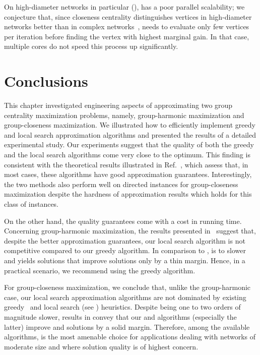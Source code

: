 On high-diameter networks in particular (),
\greedyc has a poor parallel scalability; we conjecture that, since closeness
centrality distinguishes vertices in high-diameter networks better than in
complex networks~\cite[Ch. 7]{newman2018networks}, \greedyc needs to evaluate
only few vertices per iteration before finding the vertex with highest marginal
gain. In that case, multiple cores do not speed this process up significantly.


\section{Conclusions}
%
This chapter investigated engineering aspects of
approximating  two group centrality maximization problems, namely,
group-harmonic maximization and group-closeness maximization. We illustrated
how to efficiently implement greedy and local search approximation algorithms
and presented the results of a detailed experimental study. Our experiments
suggest that the quality of both the greedy and the local search algorithms
come very close to the optimum. This finding is consistent with the theoretical
results illustrated in Ref.~\cite{DBLP:conf/alenex/AngrimanBDGGM21}, which
assess that, in most cases, these algorithms have good approximation
guarantees. Interestingly, the two methods also perform well on directed
instances for group-closeness maximization despite the hardness of
approximation results which holds for this class of instances.

On the other hand, the quality guarantees come with a cost in running time.
Concerning group-harmonic maximization, the results presented
in~ suggest that, despite the better approximation
guarantees, our local search algorithm is not competitive compared to
our greedy algorithm. In comparison to \greedyh, \greedylsh is \minSlowdLSGRHCplxDir
to \maxSlowdLSGRHRoadDirWei slower and yields solutions that improve
\greedyh solutions only by a thin margin. Hence, in a practical scenario,
we recommend using the greedy algorithm.

For group-closeness maximization, we conclude that, unlike the group-harmonic
case, our local search approximation algorithms are not dominated by
existing greedy~\cite{DBLP:conf/alenex/BergaminiGM18} and local search
(see ) heuristics.
Despite being one to two orders of magnitude slower, results in
 convey that our \gslsc and \greedylsc
algorithms (especially the latter) improve \greedyc and \gs solutions
by a solid margin. Therefore, among the available algorithms, \greedylsc is the
most amenable choice for applications dealing with networks of moderate size
and where solution quality is of highest concern.
